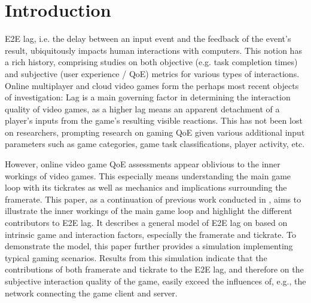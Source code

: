 \section{Introduction}
\label{sec:introduction}

\acrfull{E2E} lag, i.e. the delay between an input event and the feedback of the event's result, ubiquitously impacts human interactions with computers. This notion has a rich history, comprising studies on both objective (e.g. task completion times) and subjective (user experience / \gls{QoE}) metrics for various types of interactions. Online multiplayer and cloud video games form the perhaps most recent objects of investigation: Lag is a main governing factor in determining the interaction quality of video games, as a higher lag means an apparent detachment of a player's inputs from the game's resulting visible reactions. This has not been lost on researchers, prompting research on gaming \gls{QoE} given various additional input parameters such as game categories, game task classifications, player activity, etc. %

However, online video game \gls{QoE} assessments appear oblivious to the inner workings of video games. This especially means understanding the main game loop with its tickrates as well as mechanics and implications surrounding the framerate.
This paper, as a continuation of previous work conducted in \cite{metzger2016gamesframes}, aims to illustrate the inner workings of the main game loop and highlight the different contributors to \gls{E2E} lag. It describes a general model of \gls{E2E} lag on based on intrinsic game and interaction factors, especially the framerate and tickrate. To demonstrate the model, this paper further provides a simulation implementing typical gaming scenarios. Results from this simulation indicate that the contributions of both framerate and tickrate to the \gls{E2E} lag, and therefore on the subjective interaction quality of the game, easily exceed the influences of, e.g., the network connecting the game client and server.


